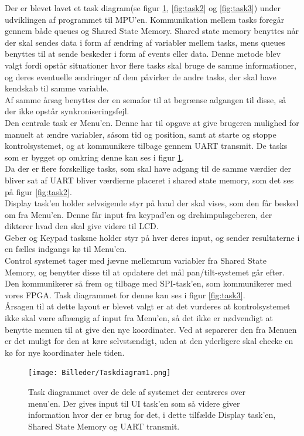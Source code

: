 Der er blevet lavet et task diagram(se figur \ref{fig:task1}, \ref{fig:task2} og \ref{fig:task3}) under udviklingen af programmet til MPU'en. Kommunikation mellem tasks foregår gennem både queues og Shared State Memory. Shared state memory benyttes når der skal sendes data i form af ændring af variabler mellem tasks, mens queues benyttes til at sende beskeder i form af events eller data. Denne metode blev valgt fordi opstår situationer hvor flere tasks skal bruge de samme informationer, og deres eventuelle ændringer af dem påvirker de andre tasks, der skal have kendskab til samme variable.
\\
Af samme årsag benyttes der en semafor til at begrænse adgangen til disse, så der ikke opstår synkroniseringsfejl.
\\
Den centrale task er Menu'en. Denne har til opgave at give brugeren mulighed for manuelt at ændre variabler, såsom tid og position, samt at starte og stoppe kontrolsystemet, og at kommunikere tilbage gennem UART transmit. De tasks som er bygget op omkring denne kan ses i figur \ref{fig:task1}.
\\
Da der er flere forskellige tasks, som skal have adgang til de samme værdier der bliver sat af UART bliver værdierne placeret i shared state memory, som det ses på figur \ref{fig:task2}.
\\
Display task'en holder selvsigende styr på hvad der skal vises, som den får besked om fra Menu'en. Denne får input fra keypad'en og drehimpulsgeberen, der dikterer hvad den skal give videre til LCD.
\\
Geber og Keypad tasksne holder styr på hver deres input, og sender resultaterne i en fælles indgangs kø til Menu'en.
\\
Control systemet tager med jævne mellemrum variabler fra Shared State Memory, og benytter disse til at opdatere det mål pan/tilt-systemet går efter. Den kommunikerer så frem og tilbage med SPI-task'en, som kommunikerer med vores FPGA. Task diagrammet for denne kan ses i figur \ref{fig:task3}.
\\
Årsagen til at dette layout er blevet valgt er at det vurderes at kontrolsystemet ikke skal være afhængig af input fra Menu'en, så det ikke er nødvendigt at benytte menuen til at give den nye koordinater. Ved at separerer den fra Menuen er det muligt for den at køre selvstændigt, uden at den yderligere skal checke en kø for nye koordinater hele tiden.

\begin{figure}[ht]
			\begin{center}
	\texttt{[image: Billeder/Taskdiagram1.png]}
			\end{center}
	\caption{Task diagrammet over de dele af systemet der centreres over menu'en. Der gives input til UI task'en som så videre giver information hvor der er brug for det, i dette tilfælde Display task'en, Shared State Memory og UART transmit.}
	\label{fig:task1}
\end{figure}

